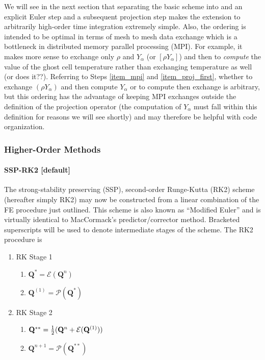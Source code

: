 \documentclass[11pt]{article}
\begin{document}
We will see in the next section that separating the basic scheme into and an explicit Euler step and a subsequent projection step makes the extension to arbitrarily high-order time integration extremely simple.  Also, the ordering is intended to be optimal in terms of mesh to mesh data exchange which is a bottleneck in distributed memory parallel processing (MPI).  For example, it makes more sense to exchange only $\rho$ and $Y_\alpha$ (or $[\rho Y_\alpha]$) and then to \emph{compute} the value of the ghost cell temperature rather than exchanging temperature as well (or does it??).  Referring to Steps \ref{item_mpi} and \ref{item_proj_first}, whether to exchange $(\rho Y_\alpha)$ and then compute $Y_\alpha$ or to compute then exchange is arbitrary, but this ordering has the advantage of keeping MPI exchanges outside the definition of the projection operator (the computation of $Y_\alpha$ must fall within this definition for reasons we will see shortly) and may therefore be helpful with code organization.


\subsubsection{Higher-Order Methods}

\paragraph{SSP-RK2 [default]}

The strong-stability preserving (SSP), second-order Runge-Kutta (RK2) scheme (hereafter simply RK2) may now be constructed from a linear combination of the FE procedure just outlined.  This scheme is also known as ``Modified Euler'' and is virtually identical to MacCormack's predictor/corrector method.  Bracketed superscripts will be used to denote intermediate stages of the scheme.  The RK2 procedure is

\begin{enumerate}
\item RK Stage 1
    \begin{enumerate}
    \item $\mathbf{Q}^{*} = \mathcal{E}(\mathbf{Q}^n)$
    \item $\mathbf{Q}^{(1)} = \mathcal{P}(\mathbf{Q}^*)$
    \end{enumerate}
\item RK Stage 2
    \begin{enumerate}
    \item $\mathbf{Q}^{**} = \mbox{$\frac{1}{2}$} (\mathbf{Q}^n + \mathcal{E}(\mathbf{Q}^{(1)}))$
    \item $\mathbf{Q}^{n+1} = \mathcal{P}(\mathbf{Q}^{**})$
    \end{enumerate}
\end{enumerate}
\end{document}
